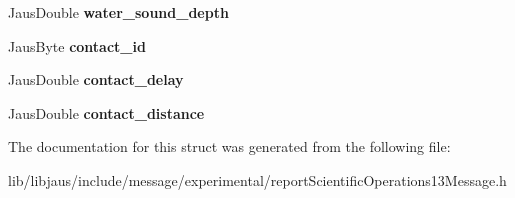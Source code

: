 \begin{DoxyCompactItemize}
\item 
\hypertarget{struct_report_scientific_operations13_message_struct_ad3fd8954252a9a8665cc4fc7c27888d0}{\-Jaus\-Double {\bfseries water\-\_\-sound\-\_\-depth}}\label{struct_report_scientific_operations13_message_struct_ad3fd8954252a9a8665cc4fc7c27888d0}

\item 
\hypertarget{struct_report_scientific_operations13_message_struct_ad8a675804650dd1e5953f8543fa53c88}{\-Jaus\-Byte {\bfseries contact\-\_\-id}}\label{struct_report_scientific_operations13_message_struct_ad8a675804650dd1e5953f8543fa53c88}

\item 
\hypertarget{struct_report_scientific_operations13_message_struct_a9a8aea56a92d17588384f378150cfea2}{\-Jaus\-Double {\bfseries contact\-\_\-delay}}\label{struct_report_scientific_operations13_message_struct_a9a8aea56a92d17588384f378150cfea2}

\item 
\hypertarget{struct_report_scientific_operations13_message_struct_a1e44bbc5c5fa420c9e630bc99094293c}{\-Jaus\-Double {\bfseries contact\-\_\-distance}}\label{struct_report_scientific_operations13_message_struct_a1e44bbc5c5fa420c9e630bc99094293c}

\end{DoxyCompactItemize}


\-The documentation for this struct was generated from the following file\-:\begin{DoxyCompactItemize}
\item 
lib/libjaus/include/message/experimental/report\-Scientific\-Operations13\-Message.\-h\end{DoxyCompactItemize}
